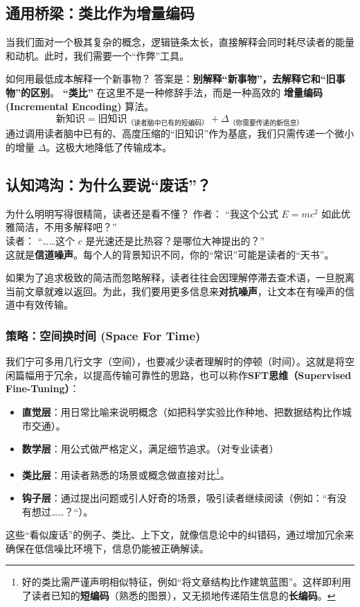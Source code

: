 \documentclass[11pt, a4paper]{ctexart}
\newcommand{\lowfreq}[1]{%
	{\Large\bfseries\color{red!60!black} #1}%
}
\begin{document}
	\subsection{通用桥梁：类比作为增量编码}
	
	当我们面对一个极其复杂的概念，逻辑链条太长，直接解释会同时耗尽读者的能量和动机。此时，我们需要一个“作弊”工具。
	
	\begin{thinkbox}{如何用最低成本解释一个新事物？}
		答案是：\textbf{别解释“新事物”，去解释它和“旧事物”的区别}。
		\lowfreq{“类比”}	在这里不是一种修辞手法，而是一种高效的\lowfreq{增量编码 (Incremental Encoding)} 算法。
		$$ \text{新知识} = \text{旧知识}_{\text{（读者脑中已有的短编码）}} + \Delta_{\text{（你需要传递的新信息）}} $$
		通过调用读者脑中已有的、高度压缩的“旧知识”作为基底，我们只需传递一个微小的增量 $\Delta$。这极大地降低了传输成本。
	\end{thinkbox}
	
		\subsection{认知鸿沟：为什么要说“废话”？}
	
	\begin{thinkbox}{为什么明明写得很精简，读者还是看不懂？}
		作者： “我这个公式 $E=mc^2$ 如此优雅简洁，不用多解释吧？”\\
		读者： “……这个 $c$ 是光速还是比热容？是哪位大神提出的？”\\
		这就是\textbf{信道噪声}。每个人的背景知识不同，你的“常识”可能是读者的“天书”。
	\end{thinkbox}
	
	如果为了追求极致的简洁而忽略解释，读者往往会因理解停滞去查术语，一旦脱离当前文章就难以返回。为此，我们要用更多信息来\textbf{对抗噪声}，让文本在有噪声的信道中有效传输。
	
	\subsubsection{策略：空间换时间 (Space For Time)}
	我们宁可多用几行文字（空间），也要减少读者理解时的停顿（时间）。这就是将空闲篇幅用于冗余，以提高传输可靠性的思路，也可以称作\textbf{SFT思维（Supervised Fine-Tuning）}：
	\begin{itemize}
		\item \textbf{直觉层}：用日常比喻来说明概念（如把科学实验比作种地、把数据结构比作城市交通）。\\
		\item \textbf{数学层}：用公式做严格定义，满足细节追求。（对专业读者）\\
		\item \textbf{类比层}：用读者熟悉的场景或概念做直接对比\footnote{好的类比需严谨声明相似特征，例如“将文章结构比作建筑蓝图”。这样即利用了读者已知的\textbf{短编码}（熟悉的图景），又无损地传递陌生信息的\textbf{长编码}。}。\\
		\item \textbf{钩子层}：通过提出问题或引人好奇的场景，吸引读者继续阅读（例如：``有没有想过……？``）。
	\end{itemize}
	这些“看似废话”的例子、类比、上下文，就像信息论中的纠错码，通过增加冗余来确保在低信噪比环境下，信息仍能被正确解读。
	
\end{document}
